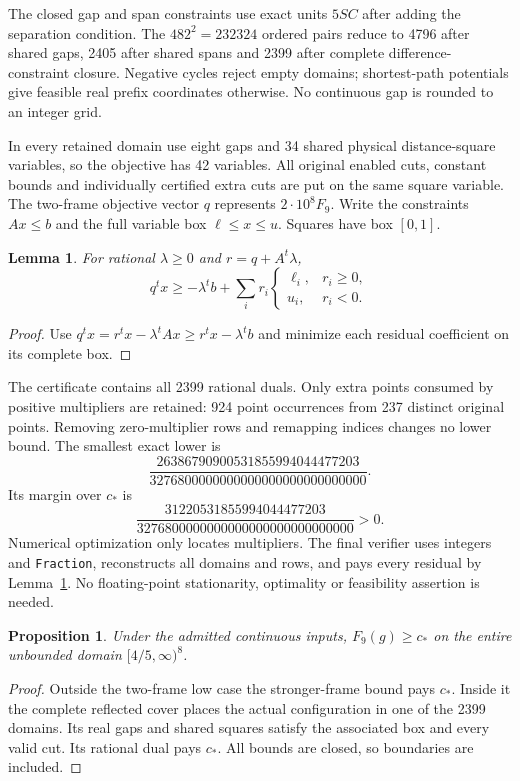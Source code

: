 \documentclass[11pt,a4paper]{article}
\newtheorem{lemma}[theorem]{Lemma}
\newtheorem{proposition}[theorem]{Proposition}
\begin{document}
The closed gap and span constraints use exact units $5SC$ after adding
the separation condition. The $482^2=232324$ ordered pairs reduce to
4796 after shared gaps, 2405 after shared spans and 2399 after complete
difference-constraint closure. Negative cycles reject empty domains;
shortest-path potentials give feasible real prefix coordinates otherwise.
No continuous gap is rounded to an integer grid.

In every retained domain use eight gaps and 34 shared physical
distance-square variables, so the objective has 42 variables. All original
enabled cuts, constant bounds and individually certified extra cuts are
put on the same square variable. The two-frame objective vector $q$
represents $2\cdot10^8F_9$. Write the constraints $Ax\le b$ and the
full variable box $\ell\le x\le u$. Squares have box $[0,1]$.

\begin{lemma}\label{lem:dual}
For rational $\lambda\ge0$ and $r=q+A^t\lambda$,
\[
 q^tx\ge-\lambda^tb+
       \sum_i r_i\begin{cases}\ell_i,&r_i\ge0,\\u_i,&r_i<0.\end{cases}
\]
\end{lemma}
\begin{proof}
Use $q^tx=r^tx-\lambda^tAx\ge r^tx-\lambda^tb$ and minimize
each residual coefficient on its complete box.
\end{proof}

The certificate contains all 2399 rational duals. Only extra points
consumed by positive multipliers are retained: 924 point occurrences
from 237 distinct original points. Removing zero-multiplier rows and
remapping indices changes no lower bound. The smallest exact lower is
\[
 \frac{26386790900531855994044477203}
      {3276800000000000000000000000000}.
\]
Its margin over $c_*$ is
\[
 \frac{31220531855994044477203}
      {3276800000000000000000000000000}>0.
\]
Numerical optimization only locates multipliers. The final verifier uses
integers and \texttt{Fraction}, reconstructs all domains and rows, and
pays every residual by Lemma~\ref{lem:dual}. No floating-point
stationarity, optimality or feasibility assertion is needed.

\begin{proposition}\label{prop:local}
Under the admitted continuous inputs, $F_9(g)\ge c_*$ on
the entire unbounded domain $[4/5,\infty)^8$.
\end{proposition}
\begin{proof}
Outside the two-frame low case the stronger-frame bound pays $c_*$.
Inside it the complete reflected cover places the actual configuration
in one of the 2399 domains. Its real gaps and shared squares satisfy
the associated box and every valid cut. Its rational dual pays $c_*$.
All bounds are closed, so boundaries are included.
\end{proof}
\end{document}
